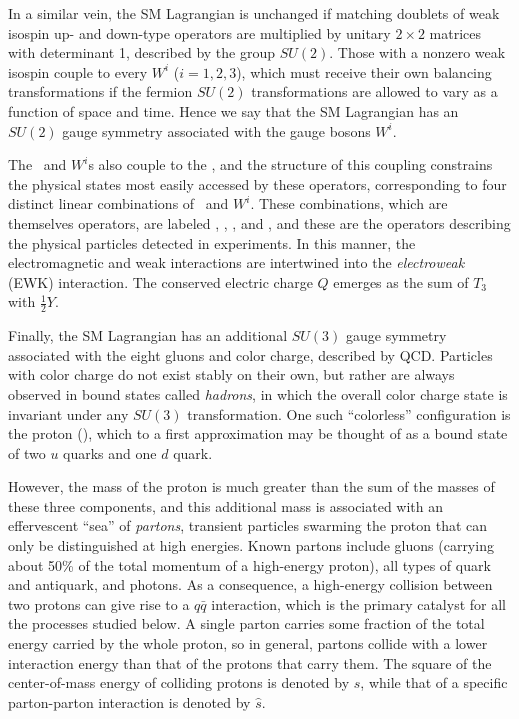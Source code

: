 In a similar vein, the SM Lagrangian is unchanged if matching doublets
of weak isospin up- and down-type operators are multiplied by unitary $2\times2$ matrices with determinant 1, described by the
group $SU(2)$. Those with a nonzero weak isospin couple to every $W^{i}$ ($i=1,2,3$), which must receive their own balancing transformations
if the fermion $SU(2)$ transformations are allowed to vary as a function of space and time.
Hence we say that the SM Lagrangian has an $SU(2)$ gauge symmetry associated with the gauge bosons $W^{i}$.

The \PB\ and $W^{i}$s also couple to the \PH, and the structure of this coupling constrains the physical states
most easily accessed by these operators, corresponding to four distinct linear combinations of
\PB\ and $W^{i}$. These combinations, which are themselves operators, are labeled \PZ, \Pgamma, \PWplus, and \PWminus,
and these are the operators describing the physical particles detected in experiments.
In this manner, the electromagnetic and weak interactions are intertwined into the \textit{electroweak} (EWK) interaction.
The conserved electric charge $Q$ emerges as the sum of $T_{3}$ with $\frac{1}{2}Y$.

Finally, the SM Lagrangian has an additional $SU(3)$ gauge symmetry associated with the eight gluons and color charge, described by QCD.
Particles with color charge do not exist stably on their own, but rather are always observed in bound states called \textit{hadrons}, in which the overall color
charge state is invariant under any $SU(3)$ transformation. One such ``colorless'' configuration is the proton (\Pp), which
to a first approximation may be thought of as a bound state of two $u$ quarks and one $d$ quark.

However, the mass of the proton is much greater than the sum of the masses of these three components, and this additional mass is associated with an effervescent
``sea'' of \textit{partons}, transient particles swarming the proton that can only be distinguished at high energies.
Known partons include gluons (carrying about 50\% of the total momentum of a high-energy proton),
all types of quark and antiquark, and photons. As a consequence, a high-energy collision between two protons can give rise to a $q\bar{q}$ interaction,
which is the primary catalyst for all the processes studied below. A single parton carries some fraction of the total energy carried by the whole proton,
so in general, partons collide with a lower interaction energy than that of the protons that carry them.
The square of the center-of-mass energy of colliding protons is denoted by $s$, while that of a specific
parton-parton interaction is denoted by $\hat{s}$.

